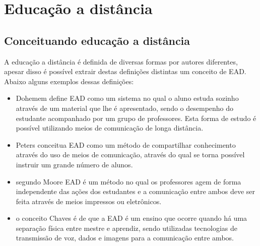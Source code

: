 \documentclass[
	12pt,				%
	openright,			%
	oneside,			%
	a4paper,			%
	english,			%
	french,				%
	spanish,			%
	brazil				%
	]{abntex2}
\begin{document}



\chapter{Educação a distância}
\section{Conceituando educação a distância}

A educação a distância é definida de diversas  formas por autores diferentes, apesar disso é possível extrair destas definições distintas um conceito de EAD. Abaixo alguns exemplos dessas definições:
 \begin{itemize}
 	\item Dohemem define EAD como um sistema no qual o aluno estuda sozinho através de um material que lhe é apresentado, sendo o desempenho do estudante acompanhado por um grupo de professores. Esta forma de estudo é possível utilizando meios de comunicação de longa distância.
 	\item Peters conceitua EAD como um método de compartilhar conhecimento através do uso de meios de comunicação, através do qual se torna possível instruir um grande número de alunos.
 	\item segundo Moore EAD é um método no qual os professores agem de forma independente das ações dos estudantes e a comunicação entre ambos deve ser feita através de meios impressos ou eletrônicos.
 	\item o conceito Chaves é de que a EAD é um ensino que ocorre quando há uma separação física entre mestre e aprendiz, sendo utilizadas tecnologias de transmissão de voz, dados e imagens para a comunicação entre ambos.  
 \end{itemize} 
 
\end{document}
